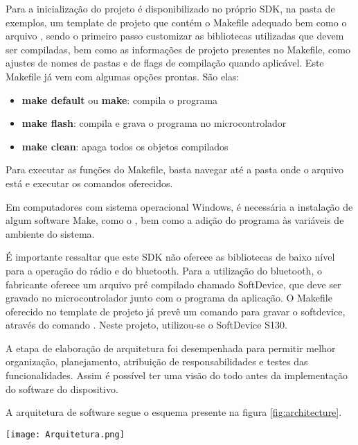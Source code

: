 Para a inicialização do projeto é disponibilizado no próprio SDK, na pasta de
exemplos, um template de projeto que contém o Makefile adequado bem como o
arquivo , sendo o primeiro passo customizar as bibliotecas
utilizadas que devem ser compiladas, bem como as informações de projeto
presentes no Makefile, como ajustes de nomes de pastas e de flags de compilação
quando aplicável. Este Makefile já vem com algumas opções prontas. São elas:

\begin{itemize}
  \item \textbf{make default} ou \textbf{make}: compila o programa
  \item \textbf{make flash}: compila e grava o programa no microcontrolador
  \item \textbf{make clean}: apaga todos os objetos compilados
\end{itemize}

Para executar as funções do Makefile, basta navegar até a pasta onde o arquivo
está e executar os comandos oferecidos.

Em computadores com sistema operacional Windows, é necessária a instalação de
algum software Make, como o , bem como a adição
do programa às variáveis de ambiente do sistema.

É importante ressaltar que este SDK não oferece as bibliotecas de
baixo nível para a operação do rádio e do bluetooth. Para a utilização do bluetooth, o
fabricante oferece um arquivo pré compilado chamado SoftDevice, que deve ser
gravado no microcontrolador junto com o programa da aplicação. O Makefile
oferecido no template de projeto já prevê um comando para gravar o softdevice,
através do comando . Neste projeto,
utilizou-se o SoftDevice S130.



A etapa de elaboração de arquitetura foi desempenhada para permitir melhor
organização, planejamento, atribuição de responsabilidades e testes das
funcionalidades.
Assim é possível ter uma visão do todo antes da implementação do software do dispositivo.

A arquitetura de software segue o esquema presente na figura
\ref{fig:architecture}.

\begin{center}
	\centering 
	\texttt{[image: Arquitetura.png]}
	\label{fig:architecture}
\end{center} 

